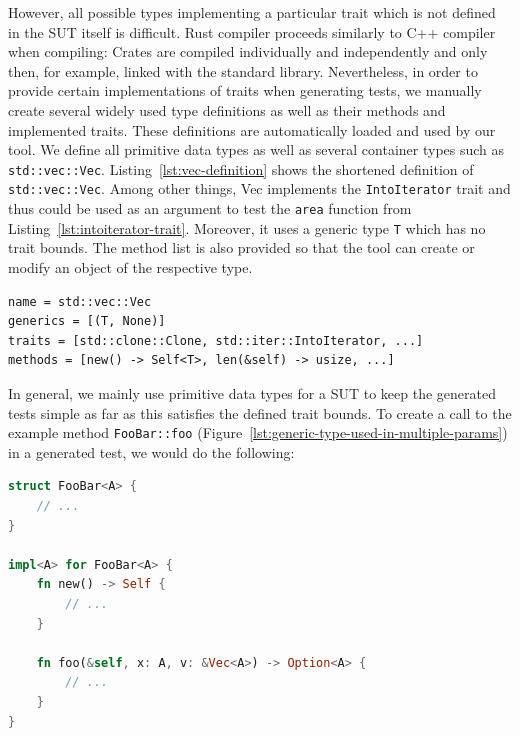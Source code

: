 \documentclass{article}
\begin{document}
However, all possible types implementing a particular trait which is not defined in the SUT itself is difficult. Rust compiler proceeds similarly to C++ compiler when compiling: Crates are compiled individually and independently and only then, for example, linked with the standard library. Nevertheless, in order to provide certain implementations of traits when generating tests, we manually create several widely used type definitions as well as their methods and implemented traits. These definitions are automatically loaded and used by our tool. We define all primitive data types as well as several container types such as \lstinline{std::vec::Vec}. Listing~\ref{lst:vec-definition} shows the shortened definition of \lstinline{std::vec::Vec}. Among other things, Vec implements the \lstinline{IntoIterator} trait and thus could be used as an argument to test the \lstinline{area} function from Listing~\ref{lst:intoiterator-trait}. Moreover, it uses a generic type \lstinline{T} which has no trait bounds. The method list is also provided so that the tool can create or modify an object of the respective type.

\begin{lstlisting}[language={}, style=boxed, caption={std::vec::Vec type definition}, label=lst:vec-definition]
name = std::vec::Vec
generics = [(T, None)]
traits = [std::clone::Clone, std::iter::IntoIterator, ...]
methods = [new() -> Self<T>, len(&self) -> usize, ...]
\end{lstlisting}

In general, we mainly use primitive data types for a \ac{SUT} to keep the generated tests simple as far as this satisfies the defined trait bounds. To create a call to the example method \lstinline{FooBar::foo} (Figure~\ref{lst:generic-type-used-in-multiple-params}) in a generated test, we would do the following: 

\begin{lstlisting}[language=Rust, style=boxed, caption={A generic type A is used in multiple parameters and return value}, label=lst:generic-type-used-in-multiple-params]
struct FooBar<A> {
    // ...
}

impl<A> for FooBar<A> {
    fn new() -> Self {
        // ...
    }

    fn foo(&self, x: A, v: &Vec<A>) -> Option<A> {
        // ...
    }
}
\end{lstlisting}
\end{document}
